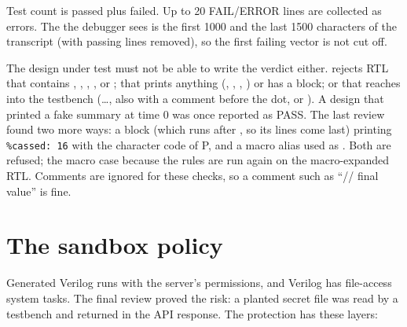 Test count is passed plus failed. Up to 20 FAIL/ERROR lines are collected as errors. The  the debugger sees is the first 1000 and the last 1500 characters of the transcript (with passing  lines removed), so the first failing vector is not cut off.

The design under test must not be able to write the verdict either.  rejects RTL that contains , , , ,  or ; that prints anything (, , , ) or has a  block; or that reaches into the testbench (\ldots, also with a comment before the dot, or ). A design that printed a fake summary at time 0 was once reported as PASS. The last review found two more ways: a  block (which runs after , so its lines come last) printing \texttt{\%cassed: 16} with the character code of P, and a macro alias  used as . Both are refused; the macro case because the rules are run again on the macro-expanded RTL. Comments are ignored for these checks, so a comment such as ``// final value'' is fine.

\section{The sandbox policy}
\label{sec:sandbox}

Generated Verilog runs with the server's permissions, and Verilog has file-access system tasks. The final review proved the risk: a planted secret file was read by a testbench and returned in the API response. The protection has these layers:


